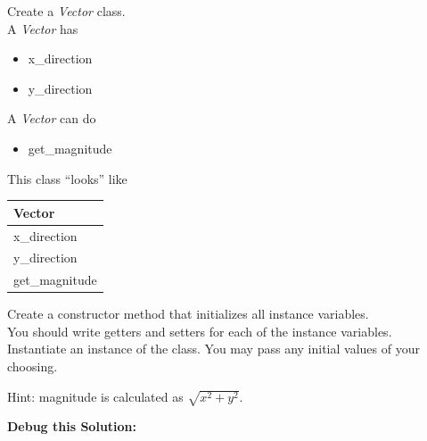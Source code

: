 \documentclass{article}
\begin{document}
\begin{enumerate}

	\begin{minipage}{.6\textwidth}
	\item Create a \textit{Vector} class.\\
		A \textit{Vector} has
		\begin{itemize}
			\item x\_direction 
			\item y\_direction
		\end{itemize}
		
		A \textit{Vector} can do
		\begin{itemize}
			\item get\_magnitude
		\end{itemize}
	\end{minipage}
	\begin{minipage}{.4\textwidth}
		This class ``looks'' like 
				
		\vspace*{1em}
		\begin{tabular}{|l|}
			\hline Vector\\ \hline
			x\_direction\\ y\_direction\\ \hline
			get\_magnitude\\  \hline
		\end{tabular}
	\end{minipage}

	\vspace*{2ex}
	Create a constructor method that initializes all instance variables.\\
	You should write getters and setters for each of the instance variables.\\
	Instantiate an instance of the class. You may pass any initial values of your choosing.
	
	Hint: magnitude is calculated as $\sqrt{x^2 + y^2}$.

		\textbf{Debug this Solution:}\\
		\mbox{ \hspace*{0.25in}	}

\pagebreak




\end{enumerate}
\end{document}
